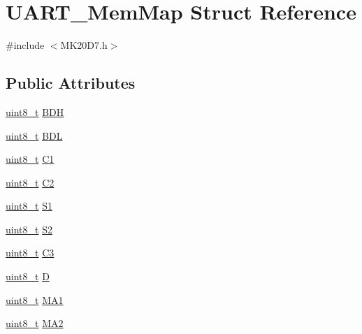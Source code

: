 \hypertarget{struct_u_a_r_t___mem_map}{}\section{U\+A\+R\+T\+\_\+\+Mem\+Map Struct Reference}
\label{struct_u_a_r_t___mem_map}


{\ttfamily \#include $<$M\+K20\+D7.\+h$>$}

\subsection*{Public Attributes}
\begin{DoxyCompactItemize}
\item 
\hyperlink{_p_e___types_8h_aba7bc1797add20fe3efdf37ced1182c5}{uint8\+\_\+t} \hyperlink{struct_u_a_r_t___mem_map_a50621a015b23211a706aa74180fa4689}{B\+DH}
\item 
\hyperlink{_p_e___types_8h_aba7bc1797add20fe3efdf37ced1182c5}{uint8\+\_\+t} \hyperlink{struct_u_a_r_t___mem_map_ac846186ffd0e53fbac32cd57c6f9acc4}{B\+DL}
\item 
\hyperlink{_p_e___types_8h_aba7bc1797add20fe3efdf37ced1182c5}{uint8\+\_\+t} \hyperlink{struct_u_a_r_t___mem_map_ac2300c7c40e63ca712d0ec5180332f4b}{C1}
\item 
\hyperlink{_p_e___types_8h_aba7bc1797add20fe3efdf37ced1182c5}{uint8\+\_\+t} \hyperlink{struct_u_a_r_t___mem_map_a3e49aeb27f3613fd01a17a3c76e785b7}{C2}
\item 
\hyperlink{_p_e___types_8h_aba7bc1797add20fe3efdf37ced1182c5}{uint8\+\_\+t} \hyperlink{struct_u_a_r_t___mem_map_a7eb8df4e43194dbd9f1d9bd4ab742cca}{S1}
\item 
\hyperlink{_p_e___types_8h_aba7bc1797add20fe3efdf37ced1182c5}{uint8\+\_\+t} \hyperlink{struct_u_a_r_t___mem_map_a6107c55f4dba727e1a4e70f76acd7b20}{S2}
\item 
\hyperlink{_p_e___types_8h_aba7bc1797add20fe3efdf37ced1182c5}{uint8\+\_\+t} \hyperlink{struct_u_a_r_t___mem_map_a2e3cebfbfb9d96766397a8a102b8c29c}{C3}
\item 
\hyperlink{_p_e___types_8h_aba7bc1797add20fe3efdf37ced1182c5}{uint8\+\_\+t} \hyperlink{struct_u_a_r_t___mem_map_a3568c1640bf7dc0e1214cddcea1e8f0c}{D}
\item 
\hyperlink{_p_e___types_8h_aba7bc1797add20fe3efdf37ced1182c5}{uint8\+\_\+t} \hyperlink{struct_u_a_r_t___mem_map_a0150c1ad073843276caf61c950794c17}{M\+A1}
\item 
\hyperlink{_p_e___types_8h_aba7bc1797add20fe3efdf37ced1182c5}{uint8\+\_\+t} \hyperlink{struct_u_a_r_t___mem_map_ab6612fcc8e4f43ebae15982f6da2b567}{M\+A2}

\end{DoxyCompactItemize}
